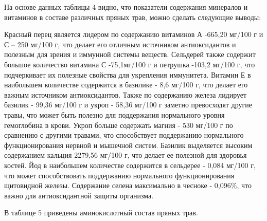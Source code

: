 
\begin{multicols}{2}
На основе данных таблицы 4 видно, что показатели содержания минералов и
витаминов в составе различных пряных трав, можно сделать следующие
выводы:

Красный перец является лидером по содержанию витаминов А -665,20 мг/100
г и С -- 250 мг/100 г, что делает его отличным источником антиоксидантов
и полезным для зрения и иммунной системы веществ. Сельдерей также
содержит большое количество витамина С -75,1мг/100 г и петрушка -103,2
мг/100 г, что подчеркивает их полезные свойства для укрепления
иммунитета. Витамин Е в наибольшем количестве содержится в базилике -
8,6 мг/100 г, что делает его важным источником антиоксидантов. Также по
содержанию железа лидирует базилик - 99,36 мг/100 г и укроп - 58,36
мг/100 г заметно превосходят другие травы, что может быть полезно для
поддержания нормального уровня гемоглобина в крови. Укроп больше
содержать магния - 530 мг/100 г по сравнению с другими травами, что
способствует поддержанию нормального функционирования нервной и мышечной
систем. Базилик выделяется высоким содержанием кальция 2279,56 мг/100 г,
что делает ее полезной для здоровья костей. Йод в наибольшем количестве
содержится в сельдерее - 0,084 мг/100 г, что может способствовать
поддержанию нормального функционирования щитовидной железы. Содержание
селена максимально в чесноке - 0,096\%, что важно для антиоксидантной
защиты организма.

В таблице 5 приведены аминокислотный состав пряных трав.
\end{multicols}

